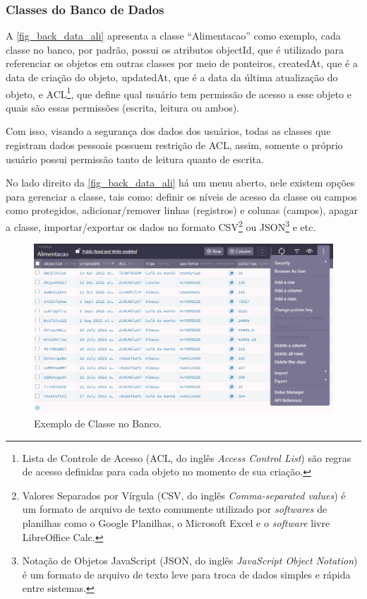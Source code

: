 \newpage

\subsubsection{Classes do Banco de Dados}

A \autoref{fig_back_data_ali} apresenta a classe ``Alimentacao'' como exemplo, cada classe no banco, por padrão,
possui os atributos objectId, que é utilizado para referenciar os objetos em outras classes por
meio de ponteiros, createdAt, que é a data de criação do objeto, updatedAt, que é a data da última atualização
do objeto, e ACL\footnote{Lista de Controle de Acesso (ACL, do inglês \emph{\textit{Access Control List}})
    são regras de acesso definidas para cada objeto no momento de sua criação.}, que define qual usuário tem permissão de acesso a
esse objeto e quais são essas permissões (escrita, leitura ou ambos).

Com isso, visando a segurança dos dados dos usuários, todas as classes que registram dados pessoais
possuem restrição de ACL, assim, somente o próprio usuário possui permissão tanto de leitura quanto de escrita.

No lado direito da \autoref{fig_back_data_ali} há um menu aberto, nele existem opções para gerenciar a classe, tais como:
definir os níveis de acesso da classe ou campos como protegidos, adicionar/remover linhas (registros) e colunas (campos),
apagar a classe, importar/exportar os dados no formato CSV\footnote{Valores Separados por Vírgula
(CSV, do inglês \emph{Comma-separated values}) é um formato de arquivo de texto comumente utilizado por
\emph{softwares} de planilhas como o Google Planilhas, o Microsoft Excel e o \emph{software} livre
LibreOffice Calc.} ou JSON\footnote{
    Notação de Objetos JavaScript (JSON, do inglês \emph{JavaScript Object Notation}) é um formato de
    arquivo de texto leve para troca de dados simples e rápida entre sistemas.
} e etc.

\begin{figure}[htb]
    \caption{\label{fig_back_data_ali}Exemplo de Classe no Banco.}
    \begin{center}
        \includegraphics[scale=0.63]{Imagens/desenvolvimento/back4app_database_alimentacao.png}
    \end{center}
\end{figure}


